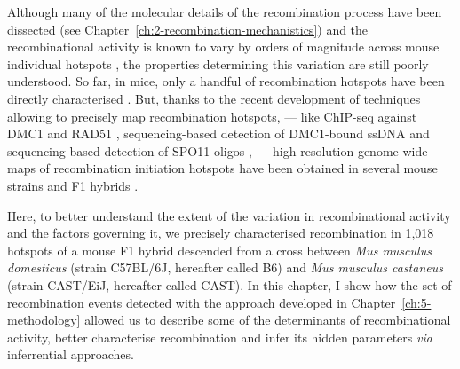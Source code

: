 \newpage

Although many of the molecular details of the recombination process have been dissected (see Chapter~\ref{ch:2-recombination-mechanistics}) and the recombinational activity is known to vary by orders of magnitude across mouse individual hotspots \citep{paigen2008recombinational}, the properties determining this variation are still poorly understood.
So far, in mice, only a handful of recombination hotspots have been directly characterised \citep{yauk2003highresolution,bois2007highly,baudat2007cis,ng2008quantitative,cole2010comprehensive,cole2014mouse}.
But, thanks to the recent development of techniques allowing to precisely map recombination hotspots, — like ChIP-seq against DMC1 and RAD51 \citep{smagulova2011genomewide}, sequencing-based detection of DMC1-bound ssDNA \citep{khil2012sensitive, brick2012genetic} and sequencing-based detection of SPO11 oligos \citep{lange2016landscape}, — high-resolution genome-wide maps of recombination initiation hotspots have been obtained in several mouse strains and F1 hybrids \citep{smagulova2016evolutionary}.

%

Here, to better understand the extent of the variation in recombinational activity and the factors governing it, we precisely characterised recombination in 1,018 hotspots of a mouse F1 hybrid descended from a cross between \textit{Mus musculus domesticus} (strain C57BL/6J, hereafter called B6) and \textit{Mus musculus castaneus} (strain CAST/EiJ, hereafter called CAST).
In this chapter, I show how the set of recombination events detected with the approach developed in Chapter~\ref{ch:5-methodology} allowed us to describe some of the determinants of recombinational activity, better characterise recombination and infer its hidden parameters \textit{via} inferrential approaches.
%





